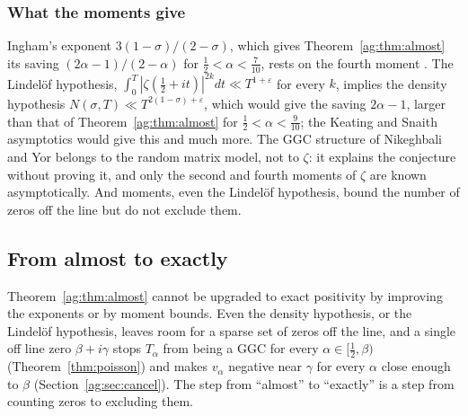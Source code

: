 \subsubsection{What the moments give}

Ingham's exponent $3(1-\sigma)/(2-\sigma)$, which gives Theorem~\ref{ag:thm:almost} its saving $(2\alpha-1)/(2-\alpha)$ for $\frac12<\alpha<\frac7{10}$, rests on the fourth moment \cite{Ingham26}. The Lindel\"of hypothesis, $\int_0^T|\zeta(\frac12+it)|^{2k}dt\ll T^{1+\varepsilon}$ for every $k$, implies the density hypothesis $N(\sigma,T)\ll T^{2(1-\sigma)+\varepsilon}$, which would give the saving $2\alpha-1$, larger than that of Theorem~\ref{ag:thm:almost} for $\frac12<\alpha<\frac9{10}$; the Keating and Snaith asymptotics would give this and much more. The GGC structure of Nikeghbali and Yor belongs to the random matrix model, not to $\zeta$: it explains the conjecture without proving it, and only the second and fourth moments of $\zeta$ are known asymptotically. And moments, even the Lindel\"of hypothesis, bound the number of zeros off the line but do not exclude them.

\subsection{From almost to exactly}\label{ag:sec:exactly}

Theorem~\ref{ag:thm:almost} cannot be upgraded to exact positivity by improving the exponents or by moment bounds. Even the density hypothesis, or the Lindel\"of hypothesis, leaves room for a sparse set of zeros off the line, and a single off line zero $\beta+i\gamma$ stops $T_\alpha$ from being a GGC for every $\alpha\in[\frac12,\beta)$ (Theorem~\ref{thm:poisson}) and makes $v_\alpha$ negative near $\gamma$ for every $\alpha$ close enough to $\beta$ (Section~\ref{ag:sec:cancel}). The step from ``almost'' to ``exactly'' is a step from counting zeros to excluding them.

